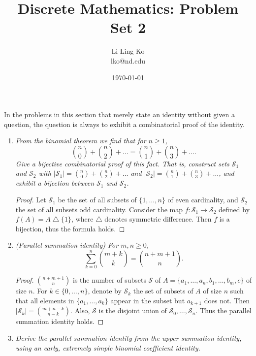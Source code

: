 \documentclass{article}
\begin{document}
\title{Discrete Mathematics: Problem Set 2}
\author{Li Ling Ko\\ lko@nd.edu}
\date{\today}
\maketitle

In the problems in this section that merely state an identity without given
a question, the question is always to exhibit a combinatorial proof of the
identity.

\begin{enumerate}[label={\bf Q\arabic*:}]
  \item \it From the binomial theorem we find that for $n\geq1$,
    \[\binom{n}{0}+\binom{n}{2}+\ldots =\binom{n}{1}+\binom{n}{3}+\ldots.\]
    Give a bijective combinatorial proof of this fact. That is, construct
    sets $\mathcal{S}_1$ and $\mathcal{S}_2$ with
    $|\mathcal{S}_1|=\binom{n}{0}+\binom{n}{2}+\ldots$ and
    $|\mathcal{S}_2|=\binom{n}{1}+\binom{n}{3}+\ldots$, and exhibit a
    bijection between $\mathcal{S}_1$ and $\mathcal{S}_2$.

    \begin{proof}
      Let $\mathcal{S}_1$ be the set of all subsets of $\{1,\ldots,n\}$
      of even cardinality, and $\mathcal{S}_2$ the set of all subsets odd
      cardinality. Consider the map
      $f:\mathcal{S}_1\rightarrow\mathcal{S}_2$ defined by
      $f(A)=A\bigtriangleup\{1\}$, where $\bigtriangleup$ denotes symmetric
      difference. Then $f$ is a bijection, thus the formula holds.
    \end{proof}

  \item \it (Parallel summation identity) For $m,n\geq0$,
    \[\sum_{k=0}^n\binom{m+k}{k} =\binom{n+m+1}{n}.\]

    \begin{proof}
      $\binom{n+m+1}{n}$ is the number of subsets $\mathcal{S}$ of
      $A=\{a_1,\ldots,a_n,b_1,\ldots,b_m,c\}$ of size $n$. For
      $k\in\{0,\ldots,n\}$, denote by $\mathcal{S}_{k}$ the set of subsets
      of $A$ of size $n$ such that all elements in $\{a_1,\ldots,a_k\}$
      appear in the subset but $a_{k+1}$ does not. Then
      $|\mathcal{S}_k|=\binom{m+n-k}{n-k}$. Also, $\mathcal{S}$ is the
      disjoint union of $\mathcal{S}_0,\ldots,\mathcal{S}_n$. Thus the
      parallel summation identity holds.
    \end{proof}

  \item \it Derive the parallel summation identity from the upper summation
    identity, using an early, extremely simple binomial coefficient
    identity.


\end{enumerate}
\end{document}
